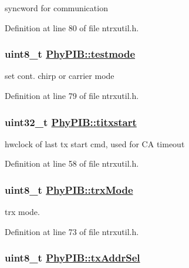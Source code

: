 syncword for communication 

Definition at line 80 of file ntrxutil.h.\hypertarget{structPhyPIB_f75531abe6c8375225a7d41947bba4be}{
\subsubsection[testmode]{\setlength{\rightskip}{0pt plus 5cm}uint8\_\-t \hyperlink{structPhyPIB_f75531abe6c8375225a7d41947bba4be}{Phy\-PIB::testmode}}}
\label{structPhyPIB_f75531abe6c8375225a7d41947bba4be}


set cont. chirp or carrier mode 

Definition at line 79 of file ntrxutil.h.\hypertarget{structPhyPIB_7434c7504f41779007906b624ed403e3}{
\subsubsection[titxstart]{\setlength{\rightskip}{0pt plus 5cm}uint32\_\-t \hyperlink{structPhyPIB_7434c7504f41779007906b624ed403e3}{Phy\-PIB::titxstart}}}
\label{structPhyPIB_7434c7504f41779007906b624ed403e3}


hwclock of last tx start cmd, used for CA timeout 

Definition at line 58 of file ntrxutil.h.\hypertarget{structPhyPIB_dcc3b9b40a2e583cf68cea317a7995a2}{
\subsubsection[trxMode]{\setlength{\rightskip}{0pt plus 5cm}uint8\_\-t \hyperlink{structPhyPIB_dcc3b9b40a2e583cf68cea317a7995a2}{Phy\-PIB::trx\-Mode}}}
\label{structPhyPIB_dcc3b9b40a2e583cf68cea317a7995a2}


trx mode. 

Definition at line 73 of file ntrxutil.h.\hypertarget{structPhyPIB_e3bb971b3713048a693899634f59f1f5}{
\subsubsection[txAddrSel]{\setlength{\rightskip}{0pt plus 5cm}uint8\_\-t \hyperlink{structPhyPIB_e3bb971b3713048a693899634f59f1f5}{Phy\-PIB::tx\-Addr\-Sel}}}
\label{structPhyPIB_e3bb971b3713048a693899634f59f1f5}


